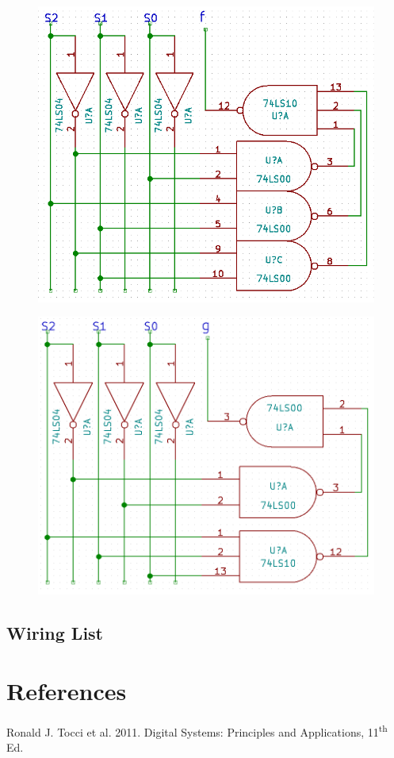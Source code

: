 \documentclass[11pt,a4paper]{article}
\begin{document}
\begin{figure}[H]
    \centering
    \includegraphics[width=6in]{f.png}
\end{figure}
\begin{figure}[H]
    \centering
    \includegraphics[width=6in]{g.png}
\end{figure}
\subsection{Wiring List}
\section{References}
Ronald J. Tocci et al. 2011. Digital Systems: Principles and Applications, 11\textsuperscript{th} Ed.
\end{document}
